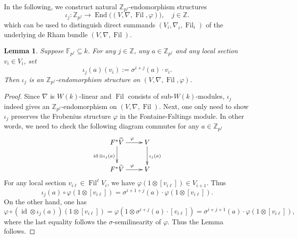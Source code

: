 \documentclass[12pt,twoside]{book}
\theoremstyle{plain}
\newtheorem{lemma}[lemma]{Lemma}
\theoremstyle{definition}
\theoremstyle{remark}
\newcommand{\bZ}{{\mathbb Z}}
\DeclareMathOperator\End{End}
\DeclareMathOperator\Fil{Fil}
\DeclareMathOperator\id{id}
\numberwithin{equation}{section}
\begin{document}
In the following, we construct natural $\bZ_{p^f}$-endomorphism structures
\[\iota_j \colon \bZ_{p^f}\rightarrow \End \Big((V,\nabla,\Fil,\varphi)\Big),\quad j\in \bZ.\]
which can be used to distinguish direct summands $(V_i,\nabla_i,\Fil_i)$ of the underlying de Rham bundle $(V,\nabla,\Fil)$.
\begin{lemma} \label{thm_ConstEndStructure} Suppose $\mathbb F_{p^f}\subseteq k$.
For any $j\in\bZ$, any $a\in\bZ_{p^f}$ and any local section $v_i\in V_i$, set
\[\iota_j(a)(v_i):=\sigma^{i+j}(a)\cdot v_i.\]
Then $\iota_j$ is an $\bZ_{p^f}$-endomorphism structure on $(V,\nabla,\Fil,\varphi)$.
\end{lemma}
\begin{proof}
Since $\nabla$ is $W(k)$-linear and $\Fil$ consists of sub-$W(k)$-modules, $\iota_j$ indeed gives an $\bZ_{p^f}$-endomorphism on $(V,\nabla,\Fil)$. Next, one only need to show $\iota_j$ preserves the Frobenius structure $\varphi$ in the Fontaine-Faltings module. In other words, we need to check the following diagram commutes for any $a\in\bZ_{p^f}$
\begin{equation*}
\xymatrix{
F^*\widetilde{V} \ar[r]^{\varphi} \ar[d]_{\id\otimes \iota_j(a)} & V \ar[d]^{\iota_j(a)}\\
F^*\widetilde{V} \ar[r]^{\varphi} & V\\
}
\end{equation*}
For any local section $v_{i\ell}\in\Fil^\ell V_i$, we have $\varphi(1\otimes[v_{i\ell}])\in V_{i+1}$. Thus
\[\iota_j(a)\circ\varphi(1\otimes[v_{i\ell}]) = \sigma^{i+1+j}(a)\cdot\varphi(1\otimes[v_{i\ell}]).\]
On the other hand, one has
\[\varphi\circ (\id\otimes \iota_j(a)) (1\otimes[v_{i\ell}]) = \varphi(1\otimes\sigma^{i+j}(a)\cdot [v_{i\ell}])=\sigma^{i+j+1}(a)\cdot \varphi(1\otimes [v_{i\ell}]),\]
where the last equality follows the $\sigma$-semilinearity of $\varphi$. Thus the Lemma follows.
\end{proof}
\end{document}
